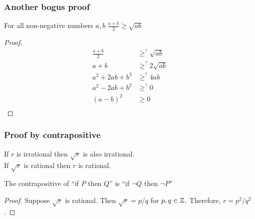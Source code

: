  \begin{frame}[fragile]
\frametitle{Another bogus proof}
\begin{theorem}
For all non-negative numbers $a,b$ $\frac{a+b}{2} \geq \sqrt{ab}$
\end{theorem}

\begin{proof}
\begin{align*}
\frac{a+b}{2} & \geq^? \sqrt{ab}\\
a+b & \geq^? 2\sqrt{ab}\\
a^2 + 2ab + b^2 & \geq^? 4ab\\
a^2 - 2ab + b^2 & \geq^? 0\\
(a-b)^2 & \geq 0\\
\end{align*}
		
\end{proof}

\end{frame}

 \begin{frame}[fragile]
\frametitle{Proof by contrapositive}
\begin{theorem}
If $r$ is irrational then $\sqrt{r}$ is also irrational.\\
If $\sqrt{r}$ is rational then $r$ is rational.
\end{theorem}


\begin{definition}[Contrapozitive]
The contrapositive of ``if $P$ then $Q$'' is ``if $\neg Q$ then $\neg P$''
\end{definition}


\begin{proof}
Suppose $\sqrt{r}$ is rational. Then $\sqrt{r}= p/q$ for $p,q \in {{\mathbb{Z}}}$. Therefore, $r = p^2/q^2$. 
\end{proof}
\end{frame}

